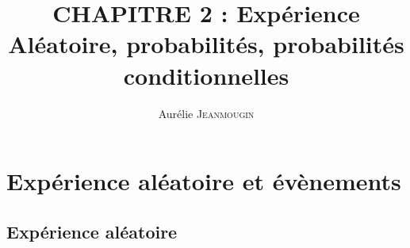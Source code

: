 \documentclass[a4paper,12pt]{article}
\title{CHAPITRE 2 : Expérience Aléatoire, probabilités, probabilités conditionnelles}
\author{Aurélie \textsc{Jeanmougin}}
\begin{document}
	
	\maketitle

\section{Expérience aléatoire et évènements}
\subsection{Expérience aléatoire}
\end{document}
